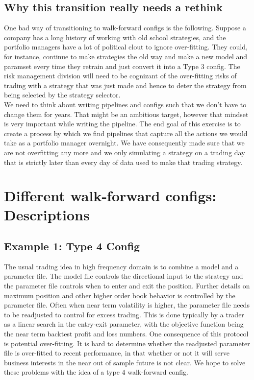\documentclass[a4paper]{article}
\begin{document}
\subsection{Why this transition really needs a rethink}
One bad way of transitioning to walk-forward configs is the following. Suppose a company has a long history of working with old school strategies, and the portfolio managers have a lot of political clout to ignore over-fitting. They could, for instance, continue to make strategies the old way and make a new model and paramset every time they retrain and just convert it into a Type 3 config. The risk management division will need to be cognizant of the over-fitting risks of trading with a strategy that was just made and hence to deter the strategy from being selected by the strategy selector.\\
We need to think about writing pipelines and configs such that we don't have to change them for years. That might be an ambitious target, however that mindset is very important while writing the pipeline. The end goal of this exercise is to create a process by which we find pipelines that capture all the actions we would take as a portfolio manager overnight. We have consequently made sure that we are not overfitting any more and we only simulating a strategy on a trading day that is strictly later than every day of data used to make that trading strategy.

\section{Different walk-forward configs: Descriptions}
\subsection{Example 1: Type 4 Config}
The usual trading idea in high frequency domain is to combine a model and a parameter file. The model file controls the directional input to the strategy and the parameter file controls when to enter and exit the position. Further details on maximum position and other higher order book behavior is controlled by the parameter file. Often when near term volatility is higher, the parameter file needs to be readjusted to control for excess trading. This is done typically by a trader as a linear search in the entry-exit parameter, with the objective function being the near term backtest profit and loss numbers. One consequence of this protocol is potential over-fitting. It is hard to determine whether the readjusted parameter file is over-fitted to recent performance, in that whether or not it will serve business interests in the near out of sample future is not clear. We hope to solve these problems with the idea of a type 4 walk-forward config.
\end{document}
